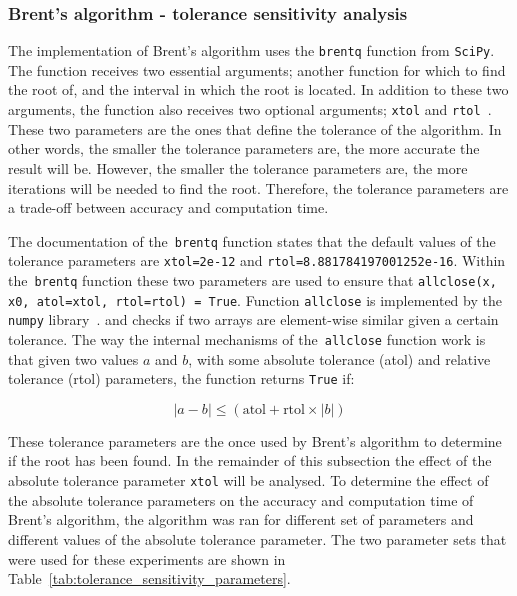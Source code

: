 \subsubsection{Brent's algorithm - tolerance sensitivity analysis}
\label{sec:brent_tolerance}

The implementation of Brent's algorithm uses the \texttt{brentq} function
from \texttt{SciPy}.
The function receives two essential arguments; another function for
which to find the root of, and the interval in which the root is located.
In addition to these two arguments, the function also receives two optional
arguments; \texttt{xtol} and
\texttt{rtol}~\cite{2020SciPy-NMeth}.
These two parameters are the ones that define the tolerance of the algorithm.
In other words, the smaller the tolerance parameters are, the more accurate
the result will be.
However, the smaller the tolerance parameters are, the more iterations will
be needed to find the root.
Therefore, the tolerance parameters are a trade-off between accuracy and
computation time.

The documentation of the~\texttt{brentq} function states
that the default values of the tolerance parameters are
\texttt{xtol=2e-12} and
\texttt{rtol=8.881784197001252e-16}.
Within the~\texttt{brentq} function these two parameters
are used to ensure that
\texttt{allclose(x, x0, atol=xtol, rtol=rtol) = True}.
Function \texttt{allclose} is implemented by the
\texttt{numpy} library~\cite{2020NumPy-Array}.
and checks if two arrays are element-wise similar given a certain tolerance.
The way the internal mechanisms of the~\texttt{allclose}
function work is that given two values \(a\) and \(b\), with some absolute
tolerance (atol) and relative tolerance (rtol) parameters, the function returns
\texttt{True} if:

\begin{equation}
    |a - b| \leq (\text{atol} + \text{rtol} \times |b|)
\end{equation}

These tolerance parameters are the once used by Brent's algorithm to determine
if the root has been found.
In the remainder of this subsection the effect of the absolute tolerance
parameter \texttt{xtol} will be analysed.
To determine the effect of the absolute tolerance parameters on the accuracy and
computation time of Brent's algorithm, the algorithm was ran for different set
of parameters and different values of the absolute tolerance parameter.
The two parameter sets that were used for these experiments are shown in
Table~\ref{tab:tolerance_sensitivity_parameters}.

